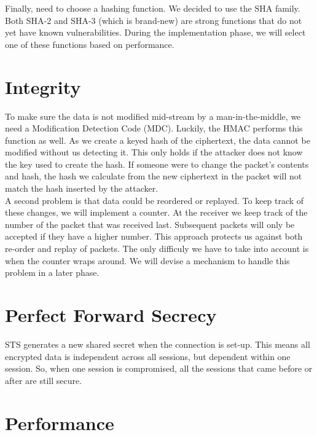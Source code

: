 \documentclass[a4paper]{article}
\begin{document}
Finally, need to choose a hashing function. We decided to use the SHA family. Both SHA-2 and SHA-3 (which is brand-new) are strong functions that do not yet have known vulnerabilities. During the implementation phase, we will select one of these functions based on performance.

\section{Integrity}

To make sure the data is not modified mid-stream by a man-in-the-middle, we need a Modification Detection Code (MDC). Luckily, the HMAC performs this function as well. As we create a keyed hash of the ciphertext, the data cannot be modified without us detecting it. This only holds if the attacker does not know the key used to create the hash. If someone were to change the packet's contents and hash, the hash we calculate from the new ciphertext in the packet will not match the hash inserted by the attacker.\\

A second problem is that data could be reordered or replayed. To keep track of these changes, we will implement a counter. At the receiver we keep track of the number of the packet that was received last. Subsequent packets will only be accepted if they have a higher number. This approach protects us against both re-order and replay of packets. The only difficuly we have to take into account is when the counter wraps around. We will devise a mechanism to handle this problem in a later phase.

\section{Perfect Forward Secrecy}

STS generates a new shared secret when the connection is set-up. This means all encrypted data is independent across all sessions, but dependent within one session. So, when one session is compromised, all the sessions that came before or after are still secure.

\section{Performance}
\end{document}
